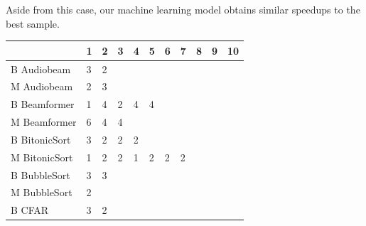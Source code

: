 Aside from this case, our machine learning model obtains similar speedups to the best sample.

\begin{table}[!htb]

  \small
 \begin{tabular} { | l | l | l | l | l | l | l | l | l | l |l| }
    \hline
      & \textbf{1} & \textbf{2} & \textbf{3} & \textbf{4} & \textbf{5} & \textbf{6} & \textbf{7} & \textbf{8} & \textbf{9} & \textbf{10} \\ \hline
    B Audiobeam & 3 & 2 & \cellcolor[gray]{0.3}& \cellcolor[gray]{0.3}& \cellcolor[gray]{0.3}& \cellcolor[gray]{0.3}& \cellcolor[gray]{0.3}& \cellcolor[gray]{0.3}& \cellcolor[gray]{0.3}& \cellcolor[gray]{0.3} \\ \hline 
    M Audiobeam & 2 & 3 & \cellcolor[gray]{0.3}& \cellcolor[gray]{0.3}& \cellcolor[gray]{0.3} & \cellcolor[gray]{0.3}& \cellcolor[gray]{0.3}& \cellcolor[gray]{0.3}& \cellcolor[gray]{0.3}& \cellcolor[gray]{0.3}\\ \hline\hline
    B Beamformer & 1 & 4 & 2 & 4 & 4& \cellcolor[gray]{0.3}& \cellcolor[gray]{0.3}& \cellcolor[gray]{0.3}& \cellcolor[gray]{0.3}& \cellcolor[gray]{0.3} \\ \hline 
    M Beamformer & 6 & 4 & 4& \cellcolor[gray]{0.3}& \cellcolor[gray]{0.3}& \cellcolor[gray]{0.3}& \cellcolor[gray]{0.3}& \cellcolor[gray]{0.3}& \cellcolor[gray]{0.3}& \cellcolor[gray]{0.3} \\ \hline\hline
    B BitonicSort & 3 & 2 & 2 & 2 & \cellcolor[gray]{0.3}& \cellcolor[gray]{0.3}& \cellcolor[gray]{0.3}& \cellcolor[gray]{0.3}& \cellcolor[gray]{0.3}& \cellcolor[gray]{0.3}  \\ \hline
    M BitonicSort & 1 & 2 & 2 & 1 & 2 & 2 & 2 & \cellcolor[gray]{0.3}& \cellcolor[gray]{0.3}& \cellcolor[gray]{0.3} \\ \hline\hline
    B BubbleSort & 3 & 3& \cellcolor[gray]{0.3} & \cellcolor[gray]{0.3} & \cellcolor[gray]{0.3}& \cellcolor[gray]{0.3}& \cellcolor[gray]{0.3}& \cellcolor[gray]{0.3}& \cellcolor[gray]{0.3}& \cellcolor[gray]{0.3} \\ \hline
    M BubbleSort & 2 & \cellcolor[gray]{0.3} & \cellcolor[gray]{0.3} & \cellcolor[gray]{0.3} & \cellcolor[gray]{0.3}& \cellcolor[gray]{0.3}& \cellcolor[gray]{0.3}& \cellcolor[gray]{0.3}& \cellcolor[gray]{0.3}& \cellcolor[gray]{0.3} \\ \hline\hline
    B CFAR & 3 & 2 & \cellcolor[gray]{0.3} & \cellcolor[gray]{0.3} & \cellcolor[gray]{0.3}& \cellcolor[gray]{0.3}& \cellcolor[gray]{0.3}& \cellcolor[gray]{0.3}& \cellcolor[gray]{0.3}& \cellcolor[gray]{0.3} \\ \hline 

\end{tabular}
\end{table}
